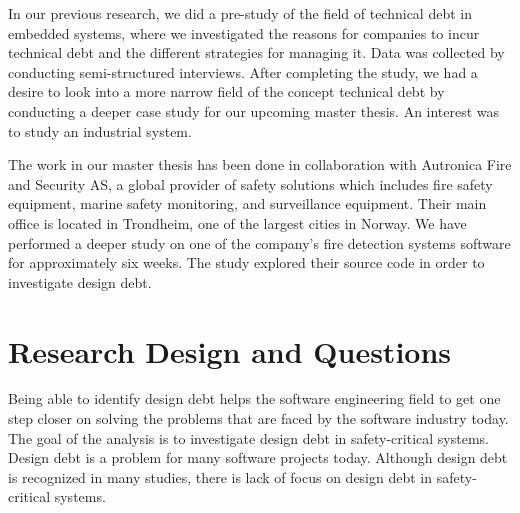 In our previous research, we did a pre-study of the field of technical debt in embedded systems, where we investigated the reasons for companies to incur technical debt and the different strategies for managing it. Data was collected by conducting semi-structured interviews. After completing the study, we had a desire to look into a more narrow field of the concept technical debt by conducting a deeper case study for our upcoming master thesis. An interest was to study an industrial system.


The work in our master thesis has been done in collaboration with Autronica Fire and Security AS, a global provider of safety solutions which includes fire safety equipment, marine safety monitoring, and surveillance equipment. Their main office is located in Trondheim, one of the largest cities in Norway. We have performed a deeper study on one of the company's fire detection systems software for approximately six weeks. The study explored their source code in order to investigate design debt. 


\section{Research Design and Questions}
\label{sec:chap1designquesitons}
Being able to identify design debt helps the software engineering field to get one step closer on solving the problems that are faced by the software industry today. The goal of the analysis is to investigate design debt in safety-critical systems. Design debt is a problem for many software projects today. Although design debt is recognized in many studies, there is lack of focus on design debt in safety-critical systems. 

